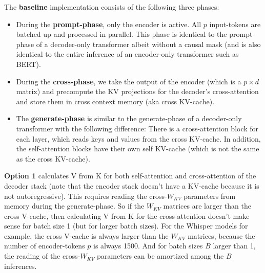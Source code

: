 \documentclass{article}
\begin{document}
The \textbf{baseline} implementation consists of the following three phases:
\begin{itemize}[topsep=-1pt]
  \item During the \textbf{prompt-phase}, only the encoder is active. All $p$ input-tokens are batched up and processed in parallel. This phase is identical to the prompt-phase of a decoder-only transformer albeit without a causal mask (and is also identical to the entire inference of an encoder-only transformer such as BERT).
  \item During the \textbf{cross-phase}, we take the output of the encoder (which is a $p \times d$ matrix) and precompute the KV projections for the decoder’s cross-attention and store them in cross context memory (aka cross KV-cache).
  \item The \textbf{generate-phase} is similar to the generate-phase of a decoder-only transformer with the following difference: There is a cross-attention block for each layer, which reads keys and values from the cross KV-cache. In addition, the self-attention blocks have their own self KV-cache (which is not the same as the cross KV-cache).
\end{itemize}

\textbf{Option 1} calculates V from K for both self-attention and cross-attention of the decoder stack (note that the encoder stack doesn’t have a KV-cache because it is not autoregressive). This requires reading the cross-$W_{KV}$ parameters from memory during the generate-phase. So if the $W_{KV}$ matrices are larger than the cross V-cache, then calculating V from K for the cross-attention doesn’t make sense for batch size 1 (but for larger batch sizes). For the Whisper models for example, the cross V-cache is always larger than the $W_{KV}$ matrices, because the number of encoder-tokens $p$ is always 1500. And for batch sizes $B$ larger than 1, the reading of the cross-$W_{KV}$ parameters can be amortized among the $B$ inferences.
\end{document}
